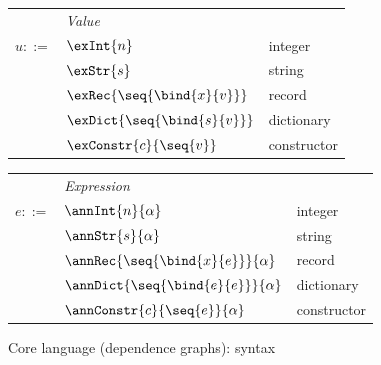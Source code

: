 \begin{figure}
   \begin{minipage}[t]{0.48\textwidth}
      \begin{tabularx}{\textwidth}{rL{2.2cm}L{3.6cm}}
          &\textit{Value}&
          \\
          $u ::=$
          &
          $\exInt{n}$
          &
          integer
          \\
          &
          $\exStr{s}$
          &
          string
          \\
          &
          $\exRec{\seq{\bind{x}{v}}}$
          &
          record
          \\
          &
          $\exDict{\seq{\bind{s}{v}}}$
          &
          dictionary
          \\
          &
          $\exConstr{c}{\seq{v}}$
          &
          constructor
          \\[0mm]
      \end{tabularx}
   \end{minipage}\hspace{3mm}%
   \begin{minipage}[t]{0.48\textwidth}
      \begin{tabularx}{\textwidth}{rL{2.2cm}L{3.6cm}}
          &\textit{Expression}&
          \\
          $e ::=$
          &
          $\annInt{n}{\alpha}$
          &
          integer
          \\
          &
          $\annStr{s}{\alpha}$
          &
          string
          \\
          &
          $\annRec{\seq{\bind{x}{e}}}{\alpha}$
          &
          record
          \\
          &
          $\annDict{\seq{\bind{e}{e}}}{\alpha}$
          &
          dictionary
          \\
          &
          $\annConstr{c}{\seq{e}}{\alpha}$
          &
          constructor
          \\[4mm]
      \end{tabularx}
   \end{minipage}
\caption{Core language (dependence graphs): syntax}
\end{figure}
